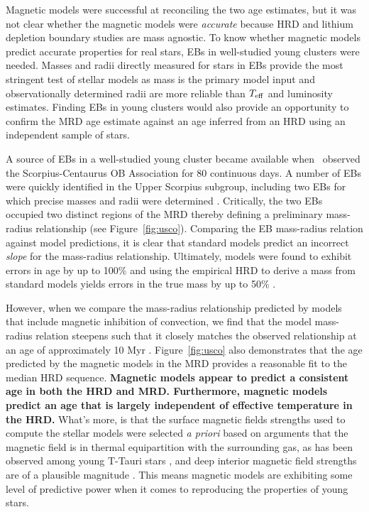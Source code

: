 Magnetic models were successful at reconciling the two age estimates, but it was not clear whether the magnetic models were {\it accurate} because HRD and lithium depletion boundary studies are mass agnostic. To know whether magnetic models predict accurate properties for real stars, EBs in well-studied young clusters were needed. Masses and radii directly measured for stars in EBs provide the most stringent test of stellar models as mass is the primary model input and observationally determined radii are more reliable than $T_{\rm eff}$ and luminosity estimates. Finding EBs in young clusters would also provide an opportunity to confirm the MRD age estimate against an age inferred from an HRD using an independent sample of stars.

A source of EBs in a well-studied young cluster became available when \kepler\ observed the Scorpius-Centaurus OB Association for 80 continuous days. A number of EBs were quickly identified in the Upper Scorpius subgroup, including two EBs for which precise masses and radii were determined \citep{Kraus2015, Alonso2015}. Critically, the two EBs occupied two distinct regions of the MRD thereby defining a preliminary mass-radius relationship (see Figure~\ref{fig:usco}). Comparing the EB mass-radius relation against model predictions, it is clear that standard models predict an incorrect {\it slope} for the mass-radius relationship. Ultimately, models were found to exhibit errors in age by up to 100\% and using the empirical HRD to derive a mass from standard models yields errors in the true mass by up to 50\% \citep{Kraus2015}.

However, when we compare the mass-radius relationship predicted by models that include magnetic inhibition of convection, we find that the model mass-radius relation steepens such that it closely matches the observed relationship at an age of approximately 10 Myr \citep[see Figure~\ref{fig:usco};][]{Feiden2016}. Figure~\ref{fig:usco} also demonstrates that the age predicted by the magnetic models in the MRD provides a reasonable fit to the median HRD sequence. {\bf Magnetic models appear to predict a consistent age in both the HRD and MRD. Furthermore, magnetic models predict an age that is largely independent of effective temperature in the HRD.} What's more, is that the surface magnetic fields strengths used to compute the stellar models were selected {\it a priori} based on arguments that the magnetic field is in thermal equipartition with the surrounding gas, as has been observed among young T-Tauri stars \citep{JohnsKrull1999}, and deep interior magnetic field strengths are of a plausible magnitude \citep{Browning2016}. This means magnetic models are exhibiting some level of predictive power when it comes to reproducing the properties of young stars.

